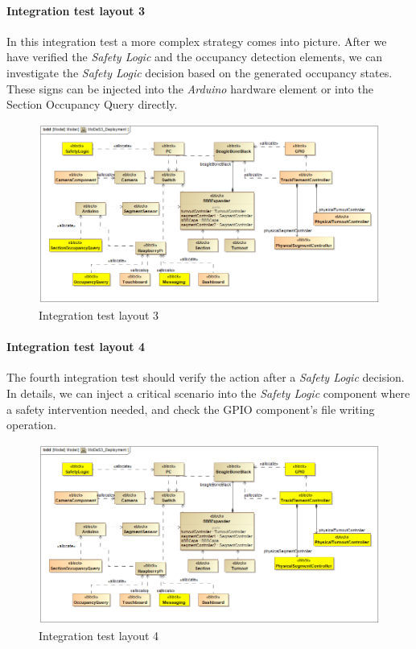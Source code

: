 \paragraph{Integration test layout 3}
In this integration test a more complex strategy comes into picture. After we have verified the \textit{Safety Logic} and the occupancy detection elements, we can investigate the \textit{Safety Logic} decision based on the generated occupancy states. These signs can be injected into the \textit{Arduino} hardware element or into the Section Occupancy Query directly.
\begin{figure}[!h]
	\centering
	\includegraphics[width=150mm, keepaspectratio]{figures/testDesign/testLayoutSYSML/MoDeS3_Deployment-test3.png}
	\caption{Integration test layout 3}
	\label{fig:MoDeS3_Deployment-test3}
\end{figure}

\paragraph{Integration test layout 4}
The fourth integration test should verify the action after a \textit{Safety Logic} decision. In details, we can inject a critical scenario into the \textit{Safety Logic} component where a safety intervention needed, and check the GPIO component's file writing operation.
\begin{figure}[!h]
	\centering
	\includegraphics[width=150mm, keepaspectratio]{figures/testDesign/testLayoutSYSML/MoDeS3_Deployment-test4.png}
	\caption{Integration test layout 4}
	\label{fig:MoDeS3_Deployment-test4}
\end{figure}

